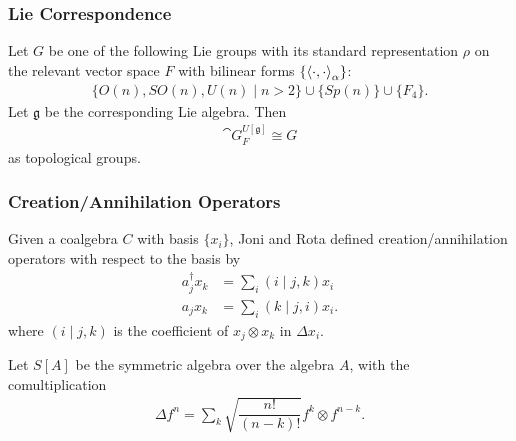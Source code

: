 \documentclass{beamer}
\begin{document}


\begin{frame}

\frametitle{Lie Correspondence}


\begin{prop}{}{}
Let $G$ be one of the following Lie groups with its standard representation $\rho$ on the relevant vector space $F$ with bilinear forms $\{ \left\langle \cdot, \cdot \right\rangle_\alpha \}$:
\begin{align*}
\{ O(n), SO(n), U(n) \mid n > 2 \} \cup \{ Sp(n) \} \cup \{ F_4 \}.
\end{align*}
Let $\mathfrak{g}$ be the corresponding Lie algebra. Then
\begin{align*}
\cat{G}_F^{U[\mathfrak{g}]} \cong G
\end{align*}
as topological groups.
\end{prop}


\end{frame}

%
%
%
%
%
%
%
%
%
%
%
%
%
%
%
%
%




\begin{frame}

\frametitle{Creation/Annihilation Operators}

Given a coalgebra $C$ with basis $\{ x_i \}$, Joni and Rota defined creation/annihilation operators with respect to the basis by
\begin{align*}
a^{\dagger}_j x_k &= \sum_i (i \mid j,k) x_i \\
a_j x_k &= \sum_i (k \mid j,i) x_i.
\end{align*}
where $(i \mid j,k)$ is the coefficient of $x_j \otimes x_k$ in $\Delta x_i$.

 Let $S[A]$ be the symmetric algebra over the algebra $A$, with the comultiplication
\begin{align*}
\Delta f^n = \sum_k \sqrt{\dfrac{n!}{(n-k)!}} f^{k} \otimes f^{n-k}.
\end{align*}



\end{frame}
\end{document}
